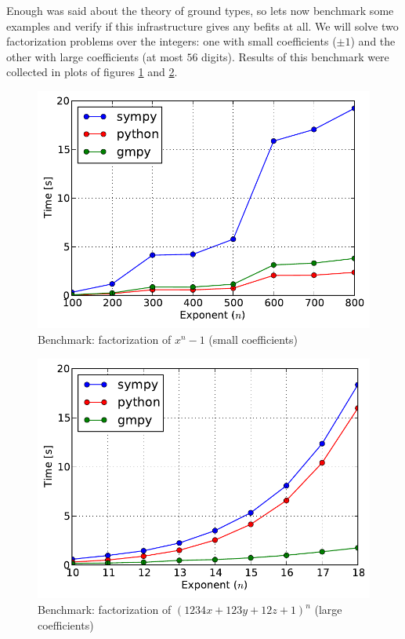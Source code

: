 Enough was said about the theory of ground types, so lets now benchmark some examples and verify
if this infrastructure gives any befits at all. We will solve two factorization problems over the
integers: one with small coefficients ($\pm 1$) and the other with large coefficients (at most $56$
digits). Results of this benchmark were collected in plots of figures \ref{fig-ground-factor-small}
and \ref{fig-ground-factor-large}.
\begin{figure}[htbp]
\centering

\includegraphics{ground-factor-small.pdf}
\caption{Benchmark: factorization of $x^n - 1$ (small coefficients)\label{fig-ground-factor-small}}\end{figure}
\begin{figure}[htbp]
\centering

\includegraphics{ground-factor-large.pdf}
\caption{Benchmark: factorization of $(1234 x + 123 y + 12 z + 1)^n$ (large coefficients)\label{fig-ground-factor-large}}\end{figure}

